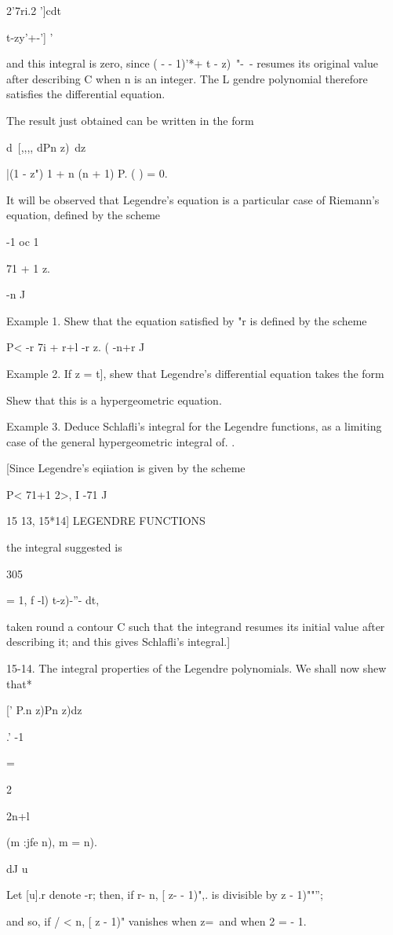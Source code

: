   2'7ri.2 ']cdt\ \ {t-zy'+-'] '

and this integral is zero, since ( - - 1)'*+ t - z)~"-~- resumes its
original value after describing C when n is an integer. The L gendre
polynomial therefore satisfies the differential equation.

The result just obtained can be written in the form

d\ [,,,, dPn z)\ dz

|(1 - z") 1 + n (n + 1) P. ( ) = 0.

It will be observed that Legendre's equation is a particular case of
Riemann's equation, defined by the scheme

-1 oc 1

71 + 1 z.

-n J

Example 1. Shew that the equation satisfied by "r is defined by the
scheme

P< -r 7i + r+l -r z. ( -n+r J

Example 2. If z = t], shew that Legendre's differential equation takes
the form

Shew that this is a hypergeometric equation.

Example 3. Deduce Schlafli's integral for the Legendre functions, as a
limiting case of the general hypergeometric integral of. .

[Since Legendre's eqiiation is given by the scheme

P< 71+1 2>, I -71 J

15 13, 15*14] LEGENDRE FUNCTIONS

the integral suggested is

305

= 1, f -l) t-z)-''- dt,

taken round a contour C such that the integrand resumes its initial
value after describing it; and this gives Schlafli's integral.]

15-14. The integral properties of the Legendre polynomials. We shall
now shew that*

[' P.n z)Pn z)dz

.' -1

=

2

2n+l

(m :jfe n), m = n).

dJ u

Let [u].r denote -r; then, if r- n, [ z- - 1)",. is divisible by z -
1)""'';

and so, if / < n, [ z - 1)" vanishes when z=\ and when 2 = - 1.

}
